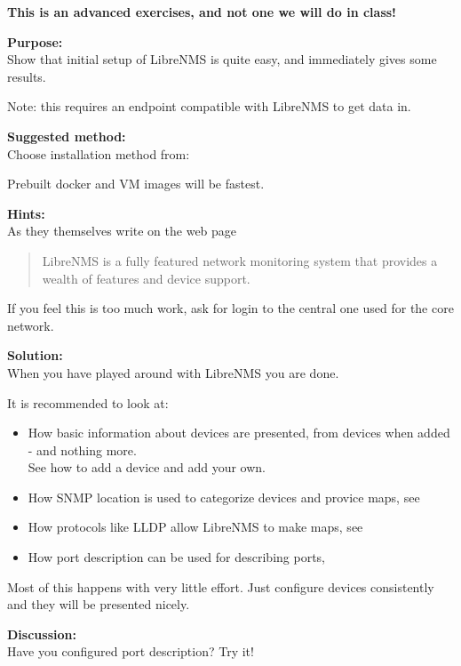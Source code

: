 \documentclass[a4paper,11pt,notitlepage]{report}
\begin{document}
{\bf This is an advanced exercises, and not one we will do in class!}

{\bf Purpose:}\\
Show that initial setup of LibreNMS is quite easy, and immediately gives some results.

Note: this requires an endpoint compatible with LibreNMS to get data in.

{\bf Suggested method:}\\
Choose installation method from:\\

Prebuilt docker and VM images will be fastest.

{\bf Hints:}\\
As they themselves write on the web page 

\begin{quote}
LibreNMS is a fully featured network monitoring system that provides a wealth of features and device support.
\end{quote}

If you feel this is too much work, ask for login to the central one used for the core network.

{\bf Solution:}\\
When you have played around with LibreNMS you are done.

It is recommended to look at:
\begin{itemize}
\item How basic information about devices are presented, from devices when added - and nothing more.\\
See how to add a device and add your own. 
\item How SNMP location is used to categorize devices and provice maps, see 
\item How protocols like LLDP allow LibreNMS to make maps, see 
\item How port description can be used for describing ports, 
\end{itemize}

Most of this happens with very little effort. Just configure devices consistently and they will be presented nicely.

{\bf Discussion:}\\
Have you configured port description? Try it!
\end{document}
